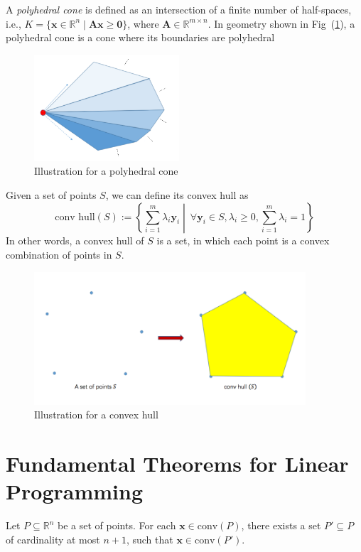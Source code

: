 \begin{definition}
A \emph{polyhedral cone} is defined as an intersection of a finite number of half-spaces, i.e., 
$K=\{\bm x\in\mathbb{R}^n\mid \bm A\bm x\ge\bm0\}$, where $\bm A\in \mathbb{R}^{m\times n}$. In geometry shown in Fig~(\ref{fig:2:4}), a polyhedral cone is a cone where its boundaries are polyhedral
\end{definition}
\begin{figure}
\centering
\includegraphics[width=0.48\textwidth]{Second_lecture/p_6}
\caption{Illustration for a polyhedral cone}
\label{fig:2:4}
\end{figure}

\begin{definition}
Given a set of points $S$, we can define its convex hull as
\[
\text{conv hull}(S):=
\left\{
\sum_{i=1}^m\lambda_i \bm y_i\middle|\ 
\forall \bm y_i\in S,
\lambda_i\ge0,
\sum_{i=1}^m\lambda_i=1
\right\}
\]
In other words, a convex hull of $S$ is a set, in which each point is a convex combination of points in $S$.
\end{definition}
\begin{figure}
\centering
\includegraphics[width=0.9\textwidth]{Second_lecture/p_7}
\caption{Illustration for a convex hull}
\label{fig:2:5}
\end{figure}

\section{Fundamental Theorems for Linear Programming}
\begin{theorem}
Let $P\subseteq \mathbb{R}^n$ be a set of points.
For each $\bm x\in\text{conv}(P)$, there exists a set $P'\subseteq P$ of cardinality at most $n+1$,
such that $\bm x\in\text{conv}(P')$.
\end{theorem}

